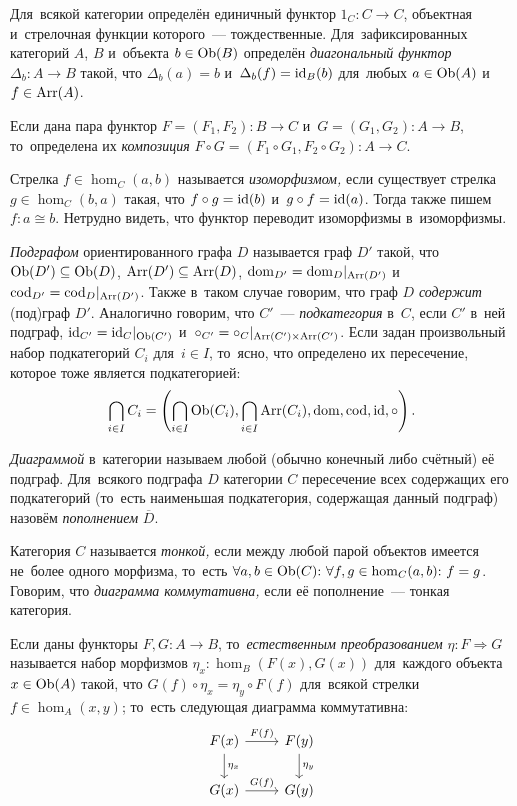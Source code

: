 \documentclass{article}
\begin{document}
Для~всякой категории определён единичный функтор $1_C : C \rightarrow C$, объектная и~стрелочная функции которого~— тождественные.
Для~зафиксированных категорий $A$, $B$ и~объекта $b \in \mathrm{Ob}(B)$ определён \textit{диагональный функтор} $\Delta_b : A \rightarrow B$
такой, что $\Delta_b(a) = b$ и~$\Delta_b(f) = \mathrm{id}_B(b)$ для~любых $a \in \mathrm{Ob}(A)$ и~$f \in \mathrm{Arr}(A)$.

Если дана пара функтор $F = (F_1, F_2) : B \rightarrow C$ и~$G = (G_1, G_2) : A \rightarrow B$,
то~определена их \textit{композиция} $F \circ G = (F_1 \circ G_1, F_2 \circ G_2) : A \rightarrow C$.

Стрелка $f \in \hom_C(a, b)$ называется \textit{изоморфизмом,} если существует стрелка $g \in \hom_C(b, a)$
такая, что $f \circ g = \mathrm{id}(b)$ и~$g \circ f = \mathrm{id}(a)$. Тогда также пишем $f : a \cong b$.
Нетрудно видеть, что функтор переводит изоморфизмы в~изоморфизмы.

\textit{Подграфом} ориентированного графа $D$ называется граф $D'$ такой, что $\mathrm{Ob}(D') \subseteq \mathrm{Ob}(D)$, $\mathrm{Arr}(D') \subseteq \mathrm{Arr}(D)$,
$\mathrm{dom}_{D'} = \mathrm{dom}_{D} |_{\mathrm{Arr}(D')}$ и~$\mathrm{cod}_{D'} = \mathrm{cod}_{D} |_{\mathrm{Arr}(D')}$.
Также в~таком случае говорим, что граф $D$ \textit{содержит} (под)граф $D'$.
Аналогично говорим, что $C'$~— \textit{подкатегория} в~$C$, если $C'$ в~ней подграф, $\mathrm{id}_{C'} = \mathrm{id}_{C} |_{\mathrm{Ob}(C')}$
и~$\circ_{C'} = \circ_{C} |_{\mathrm{Arr}(C') \times \mathrm{Arr}(C')}$.
Если задан произвольный набор подкатегорий $C_i$ для~$i \in I$, то~ясно, что определено их пересечение, которое тоже является подкатегорией:
$$
    \bigcap\limits_{i \in I} C_i = \left( \bigcap\limits_{i \in I} \mathrm{Ob}(C_i), \bigcap\limits_{i \in I} \mathrm{Arr}(C_i), \mathrm{dom}, \mathrm{cod}, \mathrm{id}, \circ \right).
$$

\textit{Диаграммой} в~категории называем любой (обычно конечный либо счётный) её подграф.
Для~всякого подграфа $D$ категории $C$ пересечение всех содержащих его подкатегорий
(то~есть наименьшая подкатегория, содержащая данный подграф) назовём \textit{пополнением} $\overline{D}$.

Категория $C$ называется \textit{тонкой,} если между любой парой объектов имеется не~более одного морфизма,
то~есть $\forall a, b \in \mathrm{Ob}(C){:}\ \forall f, g \in \hom_C(a, b){:}\ f = g$.
Говорим, что \textit{диаграмма коммутативна,} если её пополнение~— тонкая категория.

Если даны функторы $F, G : A \rightarrow B$, то~\textit{естественным преобразованием} $\eta : F \Rightarrow G$ называется набор морфизмов
$\eta_x : \hom_B(F(x), G(x))$ для~каждого объекта $x \in \mathrm{Ob}(A)$ такой, что $G(f) \circ \eta_x = \eta_y \circ F(f)$
для~всякой стрелки $f \in \hom_A(x, y)$; то~есть следующая диаграмма коммутативна:
\[
  \begin{tikzcd}
    \arrow{d}{\eta_x} F(x) \arrow{r}{F(f)} & F(y) \arrow{d}{\eta_y} \\
                      G(x) \arrow{r}{G(f)} & G(y)
  \end{tikzcd}
\]
\end{document}
